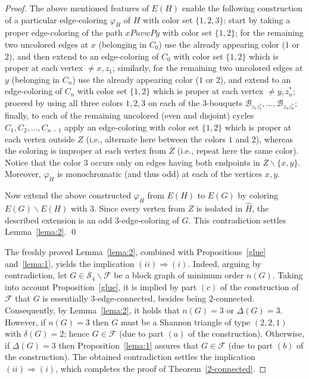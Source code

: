 \documentclass[a4paper,12pt]{article}
\numberwithin{equation}{section}
\begin{document}
\begin{proof}
The above mentioned features of $E(H)$ enable the following construction of a particular edge-coloring $\varphi_H$ of $H$ with color set $\{1,2,3\}$: start by taking a proper edge-coloring of the path $xPuvwPy$ with color set $\{1,2\}$; for the remaining two uncolored edges at $x$ (belonging in $C_0$) use the already appearing color ($1$ or $2$), and then extend to an edge-coloring of $C_0$ with color set $\{1,2\}$ which is proper at each vertex $\neq x,z_1$; similarly,  for the remaining two uncolored edges at $y$ (belonging in $C_n$) use the already appearing color ($1$ or $2$), and extend to an edge-coloring of $C_n$ with color set $\{1,2\}$ which is proper at each vertex $\neq y,z_n^*$; proceed by using all three colors $1,2,3$ on each of the $3$-bouquets $\mathcal{B}_{z_1z_1^*},\ldots,\mathcal{B}_{z_nz_n^*}$; finally, to each of the remaining uncolored (even and disjoint) cycles $C_1,C_2,\ldots,C_{n-1}$ apply an  edge-coloring with color set $\{1,2\}$ which is proper at each vertex outside $Z$ (i.e., alternate here between the colors $1$ and $2$), whereas the coloring is improper at each vertex from $Z$ (i.e., repeat here the same color). Notice that the color $3$ occurs only on edges having both endpoints in $Z\backslash\{x,y\}$. Moreover, $\varphi_H$ is monochromatic (and thus odd) at each of the vertices $x,y$.

Now extend the above constructed $\varphi_H$ from $E(H)$ to $E(G)$ by coloring $E(G)\backslash E(H)$ with $3$. Since every vertex from $Z$ is isolated in $\hat{H}$, the described extension is an odd $3$-edge-coloring of $G$. This contradiction settles Lemma~\ref{lema:2}. \qed

\medskip

The freshly proved Lemma~\ref{lema:2}, combined with Propositions~\ref{glue} and~\ref{lema:1}, yields the implication $(ii)\Rightarrow (i)$. Indeed, arguing by contradiction, let $G\in\mathcal{S}_4\backslash \mathcal{F}$ be a block graph of minimum order $n(G)$. Taking into account Proposition~\ref{glue}, it is implied by part $(c)$ of the construction of $\mathcal{F}$ that $G$ is essentially $3$-edge-connected, besides being $2$-connected. Consequently, by Lemma~\ref{lema:2}, it holds that $n(G)=3$ or $\Delta(G)=3$. However, if $n(G)=3$ then $G$ must be a Shannon triangle of type $(2,2,1)$ with $\delta(G)=2$; hence $G\in \mathcal{F}$ (due to part $(a)$ of the construction). Otherwise, if $\Delta(G)=3$ then Proposition~\ref{lema:1} assures that $G\in\mathcal{F}$ (due to part $(b)$ of the construction). The obtained contradiction settles the implication $(ii)\Rightarrow (i)$, which completes the proof of Theorem~\ref{2-connected}.
\end{proof}
\end{document}
